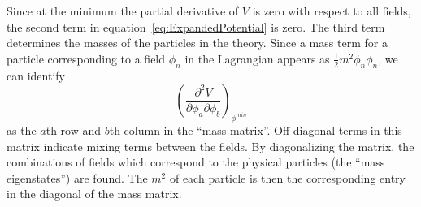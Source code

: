 Since at the minimum the partial derivative of $V$ is zero with respect to all
fields, the second term in equation~\ref{eq:ExpandedPotential} is zero.  The
third term determines the masses of the particles in the theory.  Since a mass
term for a particle corresponding to a field $\phi_n$ in the Lagrangian appears
as $\frac{1}{2}m^2\phi_n\phi_n$, we can identify 
\begin{equation}
\left(\frac {\partial^2
V}{\partial \phi_a \partial \phi_b}\right)_{\phi^{min}}
\label{eq:MassMatrixTerms}
\end{equation}
as the $a$th row and $b$th column in the ``mass matrix''.  Off diagonal terms in
this matrix indicate mixing terms between the fields.  By diagonalizing the
matrix, the combinations of fields which correspond to the physical particles
(the ``mass eigenstates'') are found.  The $m^2$ of each particle is then the
corresponding entry in the diagonal of the mass matrix.

